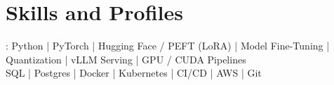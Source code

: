 \documentclass[]{jack-resume}
\begin{document}
\pagecolor{darkmodeBackground}

%
%



%
%
\begin{minipage}[t][1cm][t]{.03\textwidth}
    \hfill
\end{minipage}






\section{Skills and Profiles}
:
Python \hfill | \hfill
PyTorch \hfill | \hfill
Hugging Face / PEFT (LoRA) \hfill | \hfill
Model Fine-Tuning \hfill | \hfill
Quantization \hfill | \hfill
vLLM Serving \hfill | \hfill
GPU / CUDA Pipelines \\
\hspace{1.0cm} SQL \hfill | \hfill
Postgres \hfill | \hfill
Docker \hfill | \hfill
Kubernetes \hfill | \hfill
CI/CD \hfill | \hfill
AWS \hfill | \hfill
Git \\
\end{document}
